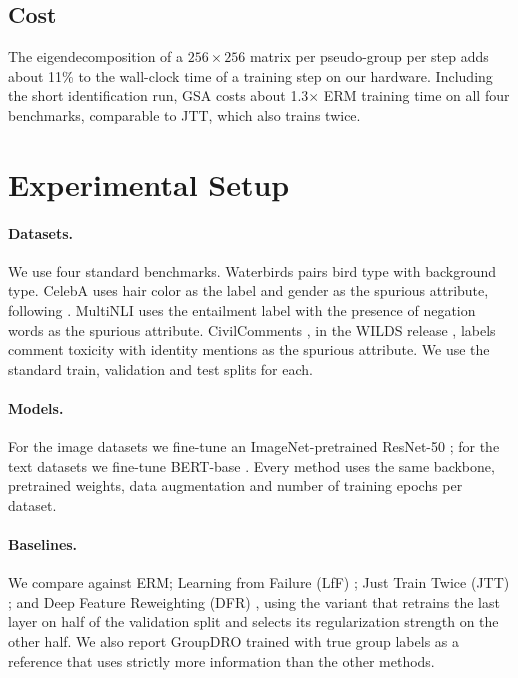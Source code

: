 \documentclass{article}
\begin{document}
\subsection{Cost}
The eigendecomposition of a $256 \times 256$ matrix per pseudo-group per step adds about 11\% to the wall-clock time of a training step on our hardware. Including the short identification run, GSA costs about 1.3$\times$ ERM training time on all four benchmarks, comparable to JTT, which also trains twice.

\section{Experimental Setup}
\label{sec:setup}

\paragraph{Datasets.}
We use four standard benchmarks. Waterbirds \citep{sagawa2020groupdro} pairs bird type with background type. CelebA \citep{liu2015celeba} uses hair color as the label and gender as the spurious attribute, following \citet{sagawa2020groupdro}. MultiNLI \citep{williams2018mnli} uses the entailment label with the presence of negation words as the spurious attribute. CivilComments \citep{borkan2019nuanced}, in the WILDS release \citep{koh2021wilds}, labels comment toxicity with identity mentions as the spurious attribute. We use the standard train, validation and test splits for each.

\paragraph{Models.}
For the image datasets we fine-tune an ImageNet-pretrained ResNet-50 \citep{he2016resnet}; for the text datasets we fine-tune BERT-base \citep{devlin2019bert}. Every method uses the same backbone, pretrained weights, data augmentation and number of training epochs per dataset.

\paragraph{Baselines.}
We compare against ERM; Learning from Failure (LfF) \citep{nam2020lff}; Just Train Twice (JTT) \citep{liu2021jtt}; and Deep Feature Reweighting (DFR) \citep{kirichenko2023dfr}, using the variant that retrains the last layer on half of the validation split and selects its regularization strength on the other half. We also report GroupDRO \citep{sagawa2020groupdro} trained with true group labels as a reference that uses strictly more information than the other methods.
\end{document}
